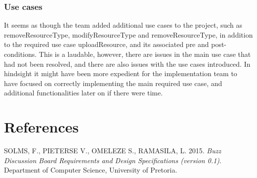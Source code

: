 \documentclass[a4paper]{article}
\begin{document}
\subsubsection {Use cases}
It seems as though the team added additional use cases to the project, such as removeResourceType, modifyResourceType and removeResourceType, in addition to the required use case uploadResource, and its associated pre and post-conditions. This is a laudable, however, there are issues in the main use case that had not been resolved, and there are also issues with the use cases introduced. In hindsight it might have been more expedient for the implementation team to have focused on correctly implementing the main required use case, and additional functionalities later on if there were time.



\section {References}
SOLMS, F., PIETERSE V., OMELEZE S., RAMASILA, L. 2015. \textit{Buzz Discussion Board Requirements and Design Specifications (version 0.1)}. Department of Computer Science, University of Pretoria.
\end{document}
